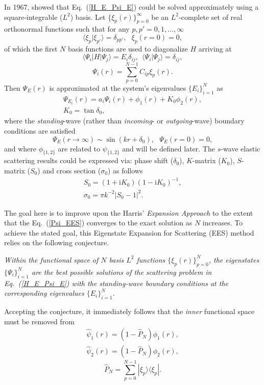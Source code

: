 \documentclass[aip
, pra
, showpacs
, aps
, twocolumn
, groupedaddress
, floatfix
]{revtex4}
\newcommand{\beq}{\begin{equation}}
\newcommand{\eeq}{\end{equation}}
\newcommand{\barr}{\begin{array}}
\newcommand{\earr}{\end{array}}
\begin{document}
In 1967, \citet{Harris67} showed that Eq.~(\ref{H_E_Psi_E}) could be solved
approximately using a square-integrable ($L^2$) basis.
Let $\{\xi_p(r)\}_{p=0}^\infty$ be an $L^2$-complete set of real orthonormal functions
such that for any $p,p'=0,1,...,\infty$
\beq
\langle \xi_p | \xi_{p'} \rangle=\delta_{pp'}, \ \ \ \xi_p(r=0)=0,
\eeq
of which the first $N$ basis functions are used to diagonalize $H$ arriving at
\beq
\langle \Psi_i |H| \Psi_j \rangle = E_i \delta_{ij} , \ \ \langle \Psi_i | \Psi_j \rangle=\delta_{ij},
\eeq
\beq
\Psi_i(r) = \sum_{p=0}^{N-1} C_{ip} \xi_p(r).
\eeq
Then $\Psi_E(r)$ is approximated at the system's eigenvalues $\{E_i\}_{i=1}^{N}$ as
\cite{Harris67}
\beq \barr{l}
\Psi_{E_i}(r) = a_i \Psi_i(r)  + \phi_1(r)  + K_0 \phi_2(r),\\
K_0 = \tan{\delta_0},
\earr \label{Psi_EES} \eeq
where the {\em standing}-wave (rather than {\em incoming}- or {\em outgoing}-wave) boundary conditions are satisfied
\beq
\Psi_E(r \rightarrow \infty) \sim \sin(kr+\delta_0), \ \ \ \Psi_E(r= 0)=0,
\eeq
and where $\phi_{\{1,2\}}$ are related to $\psi_{\{1,2\}}$ and will be defined later.
The $s$-wave elastic scattering results could be expressed via:
phase shift ($\delta_0$), $K$-matrix ($K_0$), $S$-matrix ($S_{0}$) and cross section ($\sigma_{0}$)
as follows
\beq \barr{l}
S_{0}=(1+\mbox{i}K_0)(1-\mbox{i}K_0)^{-1}, \\
\sigma_{0}=\pi k^{-2} |S_{0}-1|^2.
\earr \eeq


The goal here is to improve upon the Harris' {\em Expansion Approach} \cite{Harris67} to the extent that the Eq.~(\ref{Psi_EES})
converges to the exact solution as $N$ increases.
To achieve the stated goal, this Eigenstate Expansion for Scattering (EES) method relies on the following conjecture.


{\em Within the functional space of $N$ basis $L^2$ functions  $\{\xi_p(r)\}_{p=0}^N$,
the eigenstates $\{\Psi_i\}_{i=1}^{N}$ are the best possible solutions of the scattering problem in Eq.~(\ref{H_E_Psi_E})
with the standing-wave boundary conditions at the corresponding eigenvalues $\{E_i\}_{i=1}^{N}$.
}


Accepting the conjecture, it immediately follows that the {\em inner} functional space must be removed from
\beq \barr{l}
\hat{\psi}_1(r) = (1-\hat{P}_N) \phi_1(r),\\
\hat{\psi}_2(r) = (1-\hat{P}_N) \phi_2(r),
\earr \eeq
\beq
\hat{P}_N = \sum_{p=0}^{N-1} | \xi_p \rangle \langle \xi_p |.
\eeq
\end{document}
